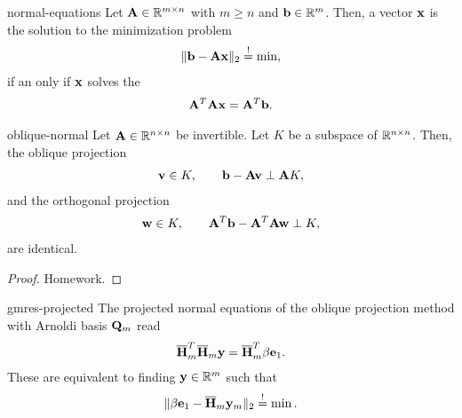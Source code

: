\begin{Theorem}{normal-equations}
  Let $\mathbf A\in\mathbb R^{m\times n}$ with $m\ge n$ and $\mathbf b\in\mathbb R^m$. Then, a vector $\mathbf x$ is the solution to the minimization problem
  \begin{gather}
    \lVert\mathbf b-\mathbf A\mathbf x\rVert_2 \stackrel{!}{=} \min,
  \end{gather}
  if an only if $\mathbf x$ solves the 
  \begin{gather}
    \mathbf A^T\mathbf A\mathbf x = \mathbf A^T \mathbf b.
  \end{gather}
\end{Theorem}

\begin{Lemma}{oblique-normal}
  Let $\mathbf A\in\mathbb R^{n\times n}$ be invertible. Let $K$ be a subspace of $\mathbb R^{n\times n}$. Then, the oblique projection
  \begin{gather}
    \mathbf v\in K, \qquad \mathbf b-\mathbf A\mathbf v \perp \mathbf A K,
  \end{gather}
  and the orthogonal projection
  \begin{gather}
    \mathbf w\in K, \qquad \mathbf A^T \mathbf b-\mathbf A^T\mathbf A\mathbf w \perp K,
  \end{gather}
  are identical.
\end{Lemma}

\begin{proof}
  Homework.
\end{proof}

\begin{Lemma}{gmres-projected}
  The projected normal equations of the oblique projection method with Arnoldi basis $\mathbf Q_m$ read
  \begin{gather}
    {\overline{\mathbf H}}^T_m\overline{\mathbf H}_m \mathbf y = {\overline{\mathbf H}}^T_m \beta \mathbf e_1.
  \end{gather}
  These are equivalent to finding $\mathbf y\in\mathbb R^m$ such that
  \begin{gather}
    \lVert\beta\mathbf e_1 - \overline{\mathbf H}_m \mathbf y_m\rVert_2 \stackrel{!}{=} \min.
  \end{gather}
\end{Lemma}

